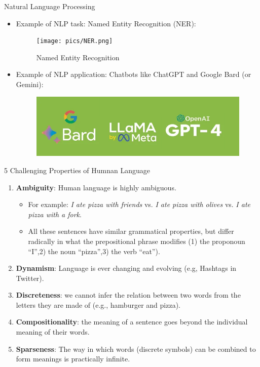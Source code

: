 \documentclass[handout]{beamer}
\begin{document}
\begin{frame}{Natural Language Processing}
\begin{scriptsize}
\begin{itemize}
\item Example of NLP task: Named Entity Recognition (NER):


     \begin{figure}[h]
        	\texttt{[image: pics/NER.png]}
        	\caption{Named Entity Recognition}
        \end{figure}

        
\item Example of NLP application: Chatbots like ChatGPT and Google Bard (or Gemini):

 \begin{figure}[h]
        	\includegraphics[scale = 0.4]{pics/gptllama.png}
        \end{figure}

\end{itemize}
\end{scriptsize}
\end{frame}



\begin{frame}{5 Challenging Properties of Humnan Language}
\begin{scriptsize}
\begin{enumerate}        
\item \textbf{Ambiguity}: Human language is highly ambiguous.
\begin{itemize}\scriptsize
 \item For example: \emph{I ate pizza with friends} vs. \emph{I ate pizza with olives} vs. \emph{I ate pizza with a fork}.
\item All these sentences have similar grammatical properties, but differ radically in what the prepositional phrase modifies (1) the proponoun ``I'',2) the noun ``pizza'',3) the verb ``eat''). 
\end{itemize}
\item \textbf{Dynamism}: Language is ever changing and evolving (e.g, Hashtags in Twitter). 
\item \textbf{Discreteness}: we cannot infer the relation between two words from the letters they are made of (e.g., hamburger and pizza). 
\item \textbf{Compositionality}: the meaning of a sentence goes beyond the individual meaning of their words. 
\item \textbf{Sparseness}: The way in which words
(discrete symbols) can be combined to form meanings is practically infinite.
\end{enumerate}
\end{scriptsize}
\end{frame}
\end{document}
